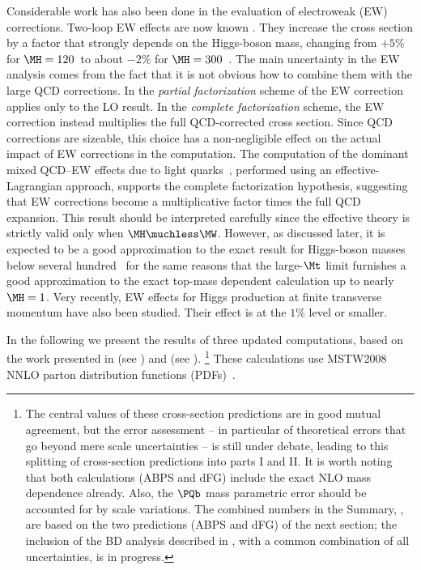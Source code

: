 Considerable work has also been done in the evaluation of electroweak (EW) corrections.
Two-loop EW effects are now known \cite{Djouadi:1994ge,Aglietti:2004nj,Degrassi:2004mx,Actis:2008ts,Actis:2008ug}.  
They increase the cross section by a factor that strongly depends on the Higgs-boson mass, changing from 
$+5\%$ for $\MH=120$\UGeV\ to about $-2\%$ for $\MH=300$\UGeV\ \cite{Actis:2008ug}.
The main uncertainty in the EW analysis comes from the fact that it is not obvious how to combine them with the large QCD corrections.
In the {\it partial factorization} scheme of 
the EW correction applies only to the LO result. In the {\em complete factorization} scheme, the EW correction instead multiplies the full 
QCD-corrected cross section.
Since QCD corrections are sizeable, this choice has a non-negligible
effect on the actual impact of EW corrections in the computation.
The computation of the dominant mixed QCD--EW effects due to light quarks~\cite{Anastasiou:2008tj},
performed using an effective-Lagrangian approach,
supports the complete factorization hypothesis, suggesting that
EW corrections become a multiplicative factor times the full QCD expansion.  This result should be interpreted carefully 
since the effective theory is strictly valid only when $\MH\muchless\MW$.  However, as discussed later, it is expected to be a good approximation to 
the exact result 
for Higgs-boson masses below several hundred \UGeV\ for the same reasons that the large-$\Mt$ limit furnishes a good approximation to the 
exact top-mass dependent calculation up to nearly $\MH = 1$\UTeV.  Very recently, EW effects for
Higgs production at finite transverse momentum \cite{Keung:2009bs,Brein:2010xj} 
have also been studied. Their effect is at the $1\%$ level or smaller.

In the following we present the results of three updated computations, based 
on the work presented in 
(see ) and 
(see ).%
\footnote{The central values of these cross-section predictions are in 
good mutual agreement, but the error assessment -- in particular
of theoretical errors that go beyond mere scale uncertainties --
is still under debate, leading to this splitting
of cross-section predictions into parts I and II.
It is worth noting that both calculations (ABPS and dFG) include the 
exact NLO mass dependence already. Also, the $\PQb$ mass parametric 
error should be accounted for by scale variations.
The combined numbers in the Summary, , are based
on the two predictions (ABPS and dFG) of the next section;
the inclusion of the BD analysis described in ,
with a common combination of all uncertainties, is in progress.}
These calculations use MSTW2008 NNLO parton distribution functions (PDFs)~\cite{Martin:2009iq}.

